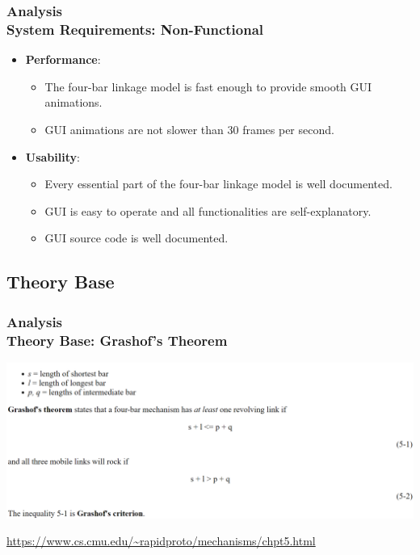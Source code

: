 \documentclass[ucs,10pt]{beamer}
\begin{document}
\begin{frame}
	\frametitle{Analysis \\
		\small \color{rwth-blue} System Requirements: Non-Functional}
	\begin{itemize}
		\item \textbf{Performance}:
		\begin{itemize}
			\item The four-bar linkage model is fast enough to provide smooth GUI animations.
			\item GUI animations are not slower than 30 frames per second.
		\end{itemize}
		\item \textbf{Usability}:
		\begin{itemize}
			\item Every essential part of the four-bar linkage model is well documented.
			\item GUI is easy to operate and all functionalities are self-explanatory.
			\item GUI source code is well documented.
		\end{itemize}
	\end{itemize}
\end{frame}

\subsection{Theory Base}

\begin{frame}
\frametitle{Analysis \\
	\small \color{rwth-blue} Theory Base: Grashof's Theorem}
	
	\begin{center}
		\includegraphics[width=\linewidth]{./Figures/introduction/introduction_classification.png}
	\end{center}
	
	{\tiny \url{https://www.cs.cmu.edu/~rapidproto/mechanisms/chpt5.html}}
\end{frame}
\end{document}
